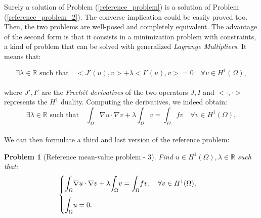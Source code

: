 \documentclass[a4paper,11pt]{article}
\newtheorem{problem}{Problem}
\begin{document}
\noindent Surely a solution of Problem (\ref{reference_problem}) is a solution of Problem (\ref{reference_problem_2}). The converse implication could be easily proved too. Then, the two problems are well-posed and completely equivalent. The advantage of the second form is that it consists in a minimization problem with constraints, a kind of problem that can be solved with generalized \emph{Lagrange Multipliers}. It means that:

\begin{equation*}
\exists \lambda \in \mathbb{R} \text{ such that} \quad <J'(u),v>+\lambda <I'(u),v>=0 \quad \forall v \in H^1(\Omega),
\end{equation*}\\
\noindent where $J',I'$ are the \emph{Frechét derivatives} of the two operators $J,I$ and $<\cdot,\cdot>$ represents the $H^1$ duality. Computing the derivatives, we indeed obtain:
\begin{equation*}
\exists \lambda \in \mathbb{R} \text{ such that} \quad \int_{\Omega}\nabla u \cdot \nabla v + \lambda \int_\Omega v = \int_{\Omega} fv \quad \forall v \in H^1(\Omega),
\end{equation*}\\

\noindent We can then formulate a third and last version of the reference problem:
\begin{problem}[Reference mean-value problem - 3]\label{reference_problem_3} Find $ u \in H^1(\Omega), \lambda \in \mathbb{R}$ such that:
	\begin{equation*}
	\begin{cases}
	\mathlarger{\int}_{\Omega}\nabla u \cdot \nabla v + \lambda \mathlarger{\int}_\Omega v = \mathlarger{\int}_{\Omega} fv, \quad \forall v \in H^1(\Omega), \\[3ex]
	\mathlarger{\int}_{\Omega}u= 0.
	\end{cases}
	\end{equation*}
\end{problem}
\end{document}
